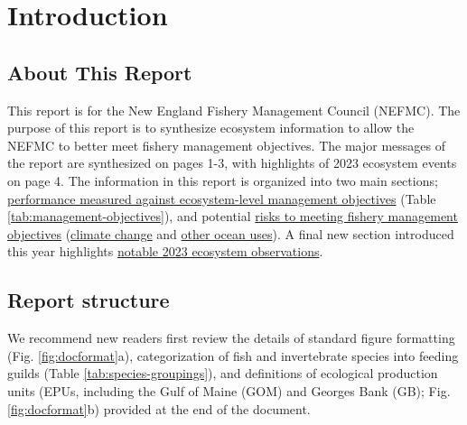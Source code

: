 \documentclass[
  10pt,
]{article}
\author{}
\date{\vspace{-2.5em}}
\begin{document}
\setcounter{page}{5}
\thispagestyle{fancy}

\hypertarget{introduction}{%
\section{Introduction}\label{introduction}}

\hypertarget{about-this-report}{%
\subsection{About This Report}\label{about-this-report}}

This report is for the New England Fishery Management Council (NEFMC). The purpose of this report is to synthesize ecosystem information to allow the NEFMC to better meet fishery management objectives. The major messages of the report are synthesized on pages 1-3, with highlights of 2023 ecosystem events on page 4. The information in this report is organized into two main sections; \protect\hyperlink{performance-relative-to-fishery-management-objectives}{performance measured against ecosystem-level management objectives} (Table \ref{tab:management-objectives}), and potential \protect\hyperlink{risks-to-meeting-fishery-management-objectives}{risks to meeting fishery management objectives} (\protect\hyperlink{climate-and-ecosystem-change}{climate change} and \protect\hyperlink{other-ocean-uses-offshore-wind}{other ocean uses}). A final new section introduced this year highlights \protect\hyperlink{highlights}{notable 2023 ecosystem observations}.

\hypertarget{report-structure}{%
\subsection{Report structure}\label{report-structure}}

We recommend new readers first review the details of standard figure formatting (Fig. \ref{fig:docformat}a), categorization of fish and invertebrate species into feeding guilds (Table \ref{tab:species-groupings}), and definitions of ecological production units (EPUs, including the Gulf of Maine (GOM) and Georges Bank (GB); Fig. \ref{fig:docformat}b) provided at the end of the document.
\end{document}

